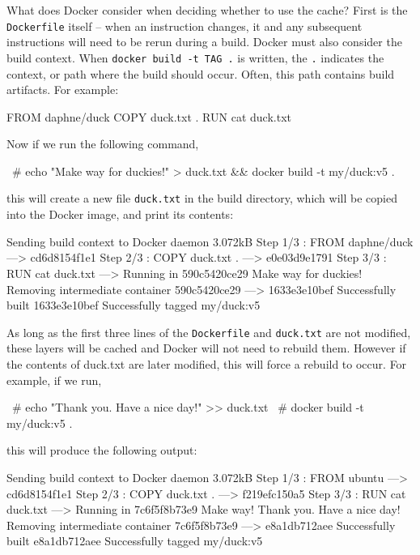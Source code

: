 \documentclass[12pt,initial,twoside,maitrise]{dms}
\def\inline{\lstinline[basicstyle=\ttfamily]}
\numberwithin{equation}{section}
\numberwithin{table}{chapter}
\numberwithin{figure}{chapter}
\begin{document}
What does Docker consider when deciding whether to use the cache? First is the \inline{Dockerfile} itself -- when an instruction changes, it and any subsequent instructions will need to be rerun during a build. Docker must also consider the build context. When \inline{docker build -t TAG .} is written, the \inline{.} indicates the context, or path where the build should occur. Often, this path contains build artifacts. For example:

\begin{filelisting}
FROM daphne/duck
COPY duck.txt .
RUN cat duck.txt
\end{filelisting}

Now if we run the following command,

\begin{pclisting}
~# echo "Make way for duckies!" > duck.txt && docker build -t my/duck:v5 .
\end{pclisting}

this will create a new file \inline{duck.txt} in the build directory, which will be copied into the Docker image, and print its contents:

\begin{pclisting}
Sending build context to Docker daemon  3.072kB
Step 1/3 : FROM daphne/duck
---> cd6d8154f1e1
Step 2/3 : COPY duck.txt .
---> e0e03d9e1791
Step 3/3 : RUN cat duck.txt
---> Running in 590c5420ce29
Make way for duckies!
Removing intermediate container 590c5420ce29
---> 1633e3e10bef
Successfully built 1633e3e10bef
Successfully tagged my/duck:v5
\end{pclisting}

As long as the first three lines of the \inline{Dockerfile} and \inline{duck.txt} are not modified, these layers will be cached and Docker will not need to rebuild them. However if the contents of duck.txt are later modified, this will force a rebuild to occur. For example, if we run,

\begin{pclisting}
~# echo "Thank you. Have a nice day!" >> duck.txt
~# docker build -t my/duck:v5 .
\end{pclisting}

this will produce the following output:

\begin{pclisting}
Sending build context to Docker daemon  3.072kB
Step 1/3 : FROM ubuntu
---> cd6d8154f1e1
Step 2/3 : COPY duck.txt .
---> f219efc150a5
Step 3/3 : RUN cat duck.txt
---> Running in 7c6f5f8b73e9
Make way!
Thank you. Have a nice day!
Removing intermediate container 7c6f5f8b73e9
---> e8a1db712aee
Successfully built e8a1db712aee
Successfully tagged my/duck:v5
\end{pclisting}
\end{document}
